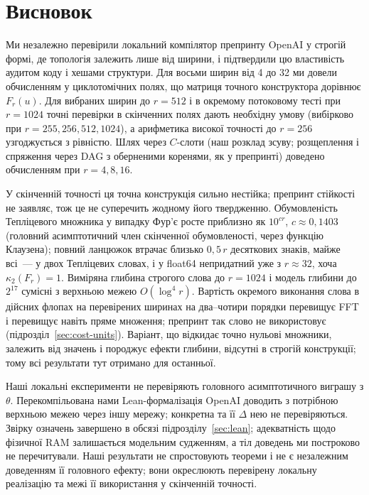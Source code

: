 \documentclass[11pt]{article}
\theoremstyle{plain}
\begin{document}
\section{Висновок}\label{sec:conclusion}
Ми незалежно перевірили локальний компілятор препринту OpenAI у строгій формі, де топологія залежить лише від ширини, і підтвердили цю властивість аудитом коду і хешами структури. Для восьми ширин від 4 до 32 ми довели обчисленням у циклотомічних полях, що матриця точного конструктора дорівнює $F_r(u)$. Для вибраних ширин до $r=512$ і в окремому потоковому тесті при $r=1024$ точні перевірки в скінченних полях дають необхідну умову (вибірково при $r=255,256,512,1024$), а арифметика високої точності до $r=256$ узгоджується з рівністю. Шлях через $C$-слоти (наш розклад зсуву; розщеплення і спряження через DAG з оберненими коренями, як у препринті) доведено обчисленням при $r=4,8,16$.

У скінченній точності ця точна конструкція сильно нестійка; препринт стійкості не заявляє, тож це не суперечить жодному його твердженню. Обумовленість Тепліцевого множника у випадку Фур'є росте приблизно як $10^{cr}$, $c\approx0{,}1403$ (головний асимптотичний член скінченної обумовленості, через функцію Клаузена); повний ланцюжок втрачає близько $0{,}5\,r$ десяткових знаків, майже всі~--- у двох Тепліцевих словах, і у float64 непридатний уже з $r\approx32$, хоча $\kappa_2(F_r)=1$. Виміряна глибина строгого слова до $r=1024$ і модель глибини до $2^{17}$ сумісні з верхньою межею $O(\log^4 r)$. Вартість окремого виконання слова в дійсних флопах на перевірених ширинах на два--чотири порядки перевищує FFT і перевищує навіть пряме множення; препринт так слово не використовує (підрозділ~\ref{sec:cost-units}). Варіант, що відкидає точно нульові множники, залежить від значень і породжує ефекти глибини, відсутні в строгій конструкції; тому всі результати тут отримано для останньої.

Наші локальні експерименти не перевіряють головного асимптотичного виграшу з $\theta$. Перекомпільована нами Lean-формалізація OpenAI доводить  з потрібною верхньою межею через іншу мережу; конкретна  та її $\Delta$ нею не перевіряються. Звірку означень завершено в обсязі підрозділу~\ref{sec:lean}; адекватність  щодо фізичної RAM залишається модельним судженням, а тіл доведень ми построково не перечитували. Наші результати не спростовують теореми і не є незалежним доведенням її головного ефекту; вони окреслюють перевірену локальну реалізацію та межі її використання у скінченній точності.
\end{document}
